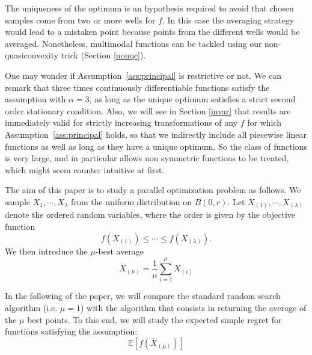 \begin{rmq}The uniqueness of the optimum is an hypothesis required to avoid that chosen samples come from two or more wells for $f$. In this case the averaging strategy would lead to a mistaken point because points from the different wells would be averaged. {Nonetheless, multimodal functions can be tackled using our non-quasiconvexity trick (Section \ref{nonqc}).}\end{rmq}
	\begin{rmq} One may wonder if Assumption~\ref{ass:principal} is restrictive or not. We can remark that three times continuously differentiable functions satisfy the assumption with $\alpha=3$, as long as the {unique} optimum satisfies a strict second order stationary condition. {Also, we will see in Section \ref{invar} that results are immediately valid for strictly increasing transformations of any $f$ for which Assumption~\ref{ass:principal} holds, so that we indirectly include all piecewise linear functions as well as long as they have a unique optimum. } So the class of functions is very large, and in particular allows non symmetric functions to be treated, which might seem counter intuitive at first. 
\end{rmq}


The aim of this paper is to study a parallel optimization problem as follows. We sample $X_{1},\cdots,X_{\lambda}$ from the uniform distribution
on $B(0,r)$. Let $X_{(1)},\cdots,X_{(\lambda)}$ denote
the ordered random variables, where the order is given by the objective
function 
\[
f(X_{(1)})\leq\cdots\leq f(X_{(\lambda)}).
\]
We then introduce the $\mu$-best average 
\[
\overline{X}_{(\mu)}=\frac{1}{\mu}\sum_{i=1}^{\mu}X_{(i)}
\]

In the following of the paper, we will compare the standard random search algorithm (i.e. $\mu=1$) with the algorithm that consists in returning the average of the $\mu$ best points. To this end, we will study the expected simple regret for functions satisfying the assumption: \[\mathbb{E}\left[f(\overline{X}_{(\mu)})\right]\]



